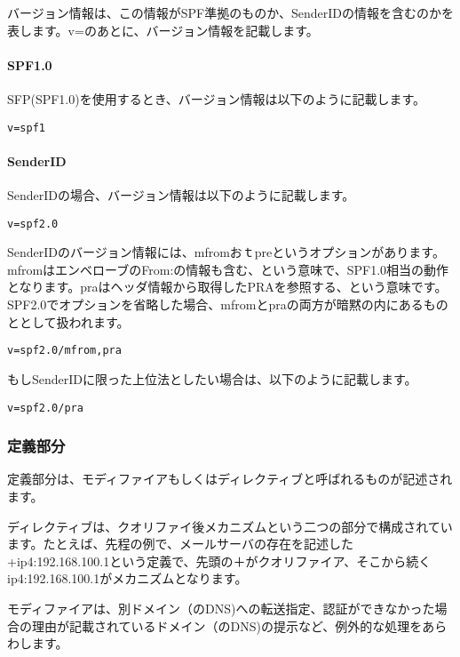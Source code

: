 バージョン情報は、この情報がSPF準拠のものか、SenderIDの情報を含むのかを表します。v=のあとに、バージョン情報を記載します。

\paragraph{SPF1.0}
SFP(SPF1.0)を使用するとき、バージョン情報は以下のように記載します。

\begin{verbatim}
v=spf1
\end{verbatim}

\paragraph{SenderID}
SenderIDの場合、バージョン情報は以下のように記載します。

\begin{verbatim}
v=spf2.0
\end{verbatim}

SenderIDのバージョン情報には、mfromおｔpreというオプションがあります。mfromはエンベローブのFrom:の情報も含む、という意味で、SPF1.0相当の動作となります。praはヘッダ情報から取得したPRAを参照する、という意味です。SPF2.0でオプションを省略した場合、mfromとpraの両方が暗黙の内にあるものととして扱われます。

\begin{verbatim}
v=spf2.0/mfrom,pra
\end{verbatim}

もしSenderIDに限った上位法としたい場合は、以下のように記載します。

\begin{verbatim}
v=spf2.0/pra
\end{verbatim}


\subsubsection{定義部分}

定義部分は、モディファイアもしくはディレクティブと呼ばれるものが記述されます。

ディレクティブは、クオリファイ後メカニズムという二つの部分で構成されています。たとえば、先程の例で、メールサーバの存在を記述した+ip4:192.168.100.1という定義で、先頭の＋がクオリファイア、そこから続くip4:192.168.100.1がメカニズムとなります。

モディファイアは、別ドメイン（のDNS)への転送指定、認証ができなかった場合の理由が記載されているドメイン（のDNS)の提示など、例外的な処理をあらわします。

